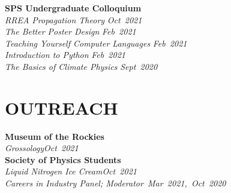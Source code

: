 \documentclass[margin]{res}
\begin{document}
\begin{resume}
\textbf{SPS Undergraduate Colloquium}\\
\hspace{3ex} {\sl RREA Propagation Theory} \hfill {\sl Oct~2021}\\\vspace{0.5ex}
\hspace{3ex} {\sl The Better Poster Design} \hfill {\sl Feb~2021}\\\vspace{0.5ex}
\hspace{3ex} {\sl Teaching Yourself Computer Languages} \hfill {\sl Feb~2021}\\\vspace{0.5ex}
\hspace{3ex} {\sl Introduction to Python} \hfill {\sl Feb~2021}\\\vspace{0.5ex}
\hspace{3ex} {\sl The Basics of Climate Physics} \hfill {\sl Sept~2020}\\

	
\section{OUTREACH}
\textbf{Museum of the Rockies}\\
\hspace{3ex} {\sl Grossology}\hfill {\sl Oct~2021}\\\vspace{0.5ex}
\textbf{Society of Physics Students}\\
\hspace{3ex} {\sl Liquid Nitrogen Ice Cream}\hfill {\sl Oct~2021}\\\vspace{0.5ex}
\hspace{3ex} {\sl Careers in Industry Panel; Moderator}\hfill {\sl ~Mar~2021,~Oct~2020}\\


%
\end{resume}
\end{document}
